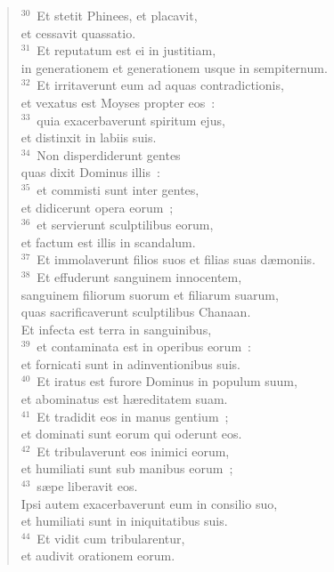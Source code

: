 \begin{flushleft}
\begin{verse}
${}^{30}$~Et stetit Phinees, et placavit,\\ et cessavit quassatio.\\
${}^{31}$~Et reputatum est ei in justitiam,\\ in generationem et generationem usque in sempiternum.\\
${}^{32}$~Et irritaverunt eum ad aquas contradictionis,\\ et vexatus est Moyses propter eos~:\\
${}^{33}$~quia exacerbaverunt spiritum ejus,\\ et distinxit in labiis suis.\\
${}^{34}$~Non disperdiderunt gentes\\ quas dixit Dominus illis~:\\
${}^{35}$~et commisti sunt inter gentes,\\ et didicerunt opera eorum~;\\
${}^{36}$~et servierunt sculptilibus eorum,\\ et factum est illis in scandalum.\\
${}^{37}$~Et immolaverunt filios suos et filias suas d\ae moniis.\\
${}^{38}$~Et effuderunt sanguinem innocentem,\\ sanguinem filiorum suorum et filiarum suarum,\\ quas sacrificaverunt sculptilibus Chanaan.\\ Et infecta est terra in sanguinibus,\\
${}^{39}$~et contaminata est in operibus eorum~:\\ et fornicati sunt in adinventionibus suis.\\
${}^{40}$~Et iratus est furore Dominus in populum suum,\\ et abominatus est h\ae reditatem suam.\\
${}^{41}$~Et tradidit eos in manus gentium~;\\ et dominati sunt eorum qui oderunt eos.\\
${}^{42}$~Et tribulaverunt eos inimici eorum,\\ et humiliati sunt sub manibus eorum~;\\
${}^{43}$~s\ae pe liberavit eos.\\ Ipsi autem exacerbaverunt eum in consilio suo,\\ et humiliati sunt in iniquitatibus suis.\\
${}^{44}$~Et vidit cum tribularentur,\\ et audivit orationem eorum.\\

\end{verse}
\end{flushleft}
